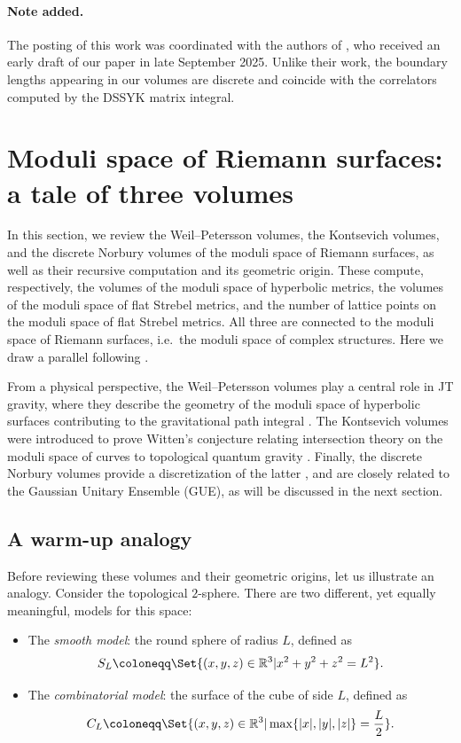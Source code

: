 \documentclass[a4paper,11pt,english]{article}
\theoremstyle{plain}
\theoremstyle{definition}
\theoremstyle{plain}
\newcommand{\R}{\mathbb{R}}
\begin{document}
\paragraph{Note added.} The posting of this work was coordinated with the authors of \cite{DN}, who received an early draft of our paper in late September 2025. Unlike their work, the boundary lengths appearing in our volumes are discrete and coincide with the correlators computed by the DSSYK matrix integral.

\section{Moduli space of Riemann surfaces: a tale of three volumes}
\label{sec:volumes}
In this section, we review the Weil--Petersson volumes, the Kontsevich volumes, and the discrete Norbury volumes of the moduli space of Riemann surfaces, as well as their recursive computation and its geometric origin. These compute, respectively, the volumes of the moduli space of hyperbolic metrics, the volumes of the moduli space of flat Strebel metrics, and the number of lattice points on the moduli space of flat Strebel metrics. All three are connected to the moduli space of Riemann surfaces, i.e.~the moduli space of complex structures. Here we draw a parallel following \cite{Gia21}.

From a physical perspective, the Weil--Petersson volumes play a central role in JT gravity, where they describe the geometry of the moduli space of hyperbolic surfaces contributing to the gravitational path integral \cite{SSSJTmatrix}. The Kontsevich volumes were introduced to prove Witten's conjecture relating intersection theory on the moduli space of curves to topological quantum gravity \cite{Wit91,Kon92}. Finally, the discrete Norbury volumes provide a discretization of the latter \cite{Nor10}, and are closely related to the Gaussian Unitary Ensemble (GUE), as will be discussed in the next section.

\subsection{A warm-up analogy}
Before reviewing these volumes and their geometric origins, let us illustrate an analogy. Consider the topological $2$-sphere. There are two different, yet equally meaningful, models for this space:
\begin{itemize}
    \item The \emph{smooth model}: the round sphere of radius $L$, defined as
    \begin{equation}
        S_L \coloneqq \Set{ (x,y,z) \in \R^3 | x^2 + y^2 + z^2 = L^2 }.
    \end{equation}
    
    \item The \emph{combinatorial model}: the surface of the cube of side $L$, defined as
    \begin{equation}
        C_L \coloneqq \Set{ (x,y,z) \in \R^3 | \max\{ |x|,|y|,|z| \} = \frac{L}{2} }.
    \end{equation}
\end{itemize}
\end{document}
